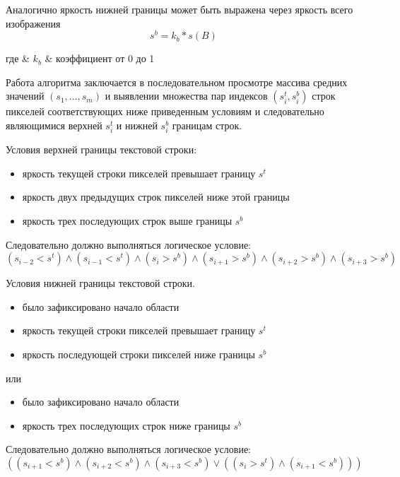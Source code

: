 Аналогично яркость нижней границы может быть выражена через яркость всего изображения
\begin{equation}
  \label{eq:architecture:line_down_interval_medium_brigth}
  s^{b} = k_{b} * s(B)
\end{equation}
\begin{explanation}
где & $ k_{b} $ & коэффициент от 0 до 1
\end{explanation}

Работа алгоритма заключается в последовательном просмотре массива средних значений $ (s_1,...,s_m) $ и выявлении множества пар индексов $ (s^t_i,s^b_i) $ строк пикселей соответствующих ниже приведенным условиям и следовательно являющимися верхней $ s^t_i $ и нижней $ s^b_i $ границам строк. 

Условия верхней границы текстовой строки:
\begin{itemize}
  \item яркость текущей строки пикселей превышает границу $ s^{t} $
  \item яркость двух предыдущих строк пикселей ниже этой границы
  \item яркость трех последующих строк выше границы $ s^{b} $
\end{itemize}

Следовательно должно выполняться логическое условие:
\begin{equation}
  \label{eq:architecture:logic_up_interval}
  (s_{i-2} < s^{t}) \wedge (s_{i-1} < s^{t}) \wedge (s_i > s^{b}) \wedge (s_{i+1} > s^{b}) \wedge (s_{i+2} > s^{b}) \wedge (s_{i+3} > s^{b})
\end{equation}

Условия нижней границы текстовой строки.
\begin{itemize}     
  \item было зафиксировано начало области
  \item яркость текущей строки пикселей превышает границу $ s^{t} $
  \item яркость последующей строки пикселей ниже границы $ s^{b} $
\end{itemize}
     
или

\begin{itemize}
   \item было зафиксировано начало области
   \item яркость трех последующих строк ниже границы $ s^{b} $
\end{itemize}

Следовательно должно выполняться логическое условие:
\begin{equation}
  \label{eq:architecture:logic_down_interval}
  ((s_{i+1} < s^{b}) \wedge (s_{i+2} < s^{b}) \wedge (s_{i+3} < s^{b}) \vee ((s_i > s^{t}) \wedge (s_{i+1} < s^{b})))
\end{equation}

